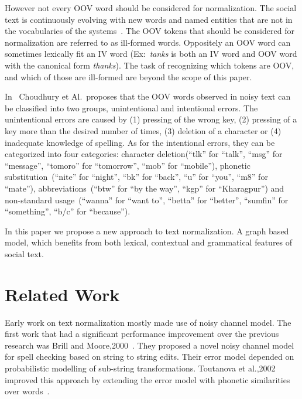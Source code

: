 \documentclass[preprint,review,12pt]{elsarticle}
\begin{document}
However not every OOV word should be considered for normalization. The social text is continuously evolving with new words and named entities that are not in the vocabularies of the systems~\cite{DBLP:conf/acl/HassanM13}. The OOV tokens that should be considered for normalization are referred to as ill-formed words. Oppositely an OOV word can sometimes lexically fit an IV word (Ex:~\textit{tanks} is both an IV word and OOV word with the canonical form \textit{thanks}). The task of recognizing which tokens are OOV, and which of those are ill-formed are beyond the scope of this paper.

In~\cite{Choudhury:2007:IMS:1326044.1326048} Choudhury et Al.~proposes that the OOV words observed in noisy text can be classified into two groups, unintentional and intentional errors. The unintentional errors are caused by (1) pressing of the wrong key, (2) pressing of a key more than the desired number of times, (3) deletion of a character or (4) inadequate knowledge of spelling. As for the intentional errors, they can be categorized into four categories: character deletion(``tlk'' for ``talk'', ``msg'' for ``message'', ``tomoro'' for ``tomorrow'', ``mob'' for ``mobile''), phonetic substitution~(``nite'' for ``night'', ``bk'' for ``back'', ``u'' for ``you'', ``m8'' for ``mate''), abbreviations~(``btw'' for ``by the way'', ``kgp'' for ``Kharagpur'') and non-standard usage~(``wanna'' for ``want to'', ``betta'' for ``better'', ``sumfin'' for ``something'', ``b/c'' for ``because'').

In this paper we propose a new approach to text normalization. A graph based model, which benefits from both lexical, contextual and grammatical features of social text.

\section{Related Work}
\label{sec:related}

Early work on text normalization mostly made use of noisy channel model. The first work that had a significant performance improvement over the previous research was Brill and Moore,2000~\cite{Brill:2000:IEM:1075218.1075255}. They proposed a novel noisy channel model for spell checking based on string to string edits. Their error model depended on probabilistic modelling of sub-string transformations. Toutanova et al.,2002 improved this approach by extending the error model with phonetic similarities over words~\cite{Toutanova:2002:PMI:1073083.1073109}.
\end{document}
